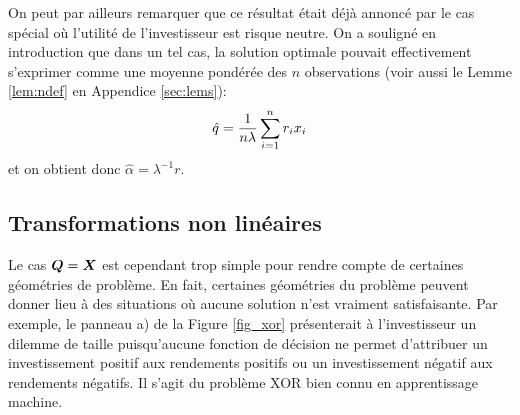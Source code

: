 On peut par ailleurs remarquer que ce résultat était déjà annoncé par le cas spécial où
l'utilité de l'investisseur est risque neutre. On a souligné en introduction que dans un
tel cas, la solution optimale pouvait effectivement s'exprimer comme une moyenne pondérée
des $n$ observations (voir aussi le Lemme \ref{lem:ndef} en Appendice \ref{sec:lems}):
\begin{equation}
  \hat q = \frac{1}{n\lambda}\sum_{i=1}^n r_i x_i
\end{equation}
et on obtient donc $\hat\alpha = \lambda^{-1}r$. 



\subsection{Transformations non linéaires}

Le cas $\bm Q = \bm{X}$ est cependant trop simple pour rendre compte de certaines géométries de
problème. En fait, certaines géométries du problème peuvent donner lieu à des situations
où aucune solution n'est vraiment satisfaisante. Par exemple, le panneau a) de la Figure
\ref{fig_xor} présenterait à l'investisseur un dilemme de taille puisqu'aucune fonction de
décision ne permet d'attribuer un investissement positif aux rendements positifs ou un
investissement négatif aux rendements négatifs. Il s'agit du problème XOR bien connu en
apprentissage machine.


